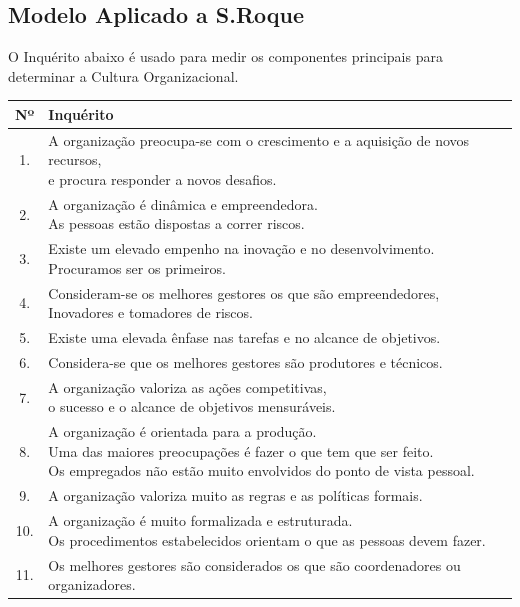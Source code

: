 {\subsection{Modelo Aplicado a S.Roque}
O Inquérito abaixo é usado para medir os componentes principais para determinar a Cultura Organizacional.
\begin{table}[h!]
\begin{adjustbox}{max width=\textwidth}
\begin{tabular}{ |c|l| }
\hline
\rowcolor[gray]{0.5}
Nº & Inquérito \\
\hline
1. & \makecell[l]{A organização preocupa-se com o crescimento e a aquisição de novos recursos, \\ e procura responder a novos desafios.} \\
\hline
2. & \makecell[l]{A organização é dinâmica e empreendedora. \\ As pessoas estão dispostas a correr riscos.} \\
\hline
3. & \makecell[l]{Existe um elevado empenho na inovação e no desenvolvimento. \\ Procuramos ser os primeiros.} \\
\hline
4. & \makecell[l]{Consideram-se os melhores gestores os que são empreendedores, \\ Inovadores e tomadores de riscos.} \\
\hline
5. & Existe uma elevada ênfase nas tarefas e no alcance de objetivos. \\
\hline
6. & Considera-se que os melhores gestores são produtores e técnicos. \\
\hline
7. & \makecell[l]{A organização valoriza as ações competitivas, \\ o sucesso e o alcance de objetivos mensuráveis.} \\
\hline
8. & \makecell[l]{A organização é orientada para a produção. \\ Uma das maiores preocupações é fazer o que tem que ser feito. \\ Os empregados não estão muito envolvidos do ponto de vista pessoal.} \\
\hline
9. & A organização valoriza muito as regras e as políticas formais. \\
\hline
10. & \makecell[l]{A organização é muito formalizada e estruturada. \\ Os procedimentos estabelecidos orientam o que as pessoas devem fazer.} \\
\hline
11. & Os melhores gestores são considerados os que são coordenadores ou organizadores.  \\

\end{tabular}
\end{adjustbox}
\end{table}}
